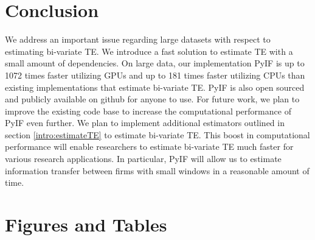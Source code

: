 \section{Conclusion}

We address an important issue regarding large datasets with respect to estimating bi-variate TE. We introduce a fast solution to estimate TE with a small amount of dependencies. On large data, our implementation PyIF is up to 1072 times faster utilizing GPUs and up to 181 times faster utilizing CPUs than existing implementations that estimate bi-variate TE.  PyIF is also open sourced and publicly available on github for anyone to use.  For future work, we plan to improve the existing code base to increase the computational performance of PyIF even further. We plan to implement additional estimators outlined in section  \ref{intro:estimateTE} to estimate bi-variate TE. This boost in computational performance will enable researchers to estimate bi-variate TE much faster for various research applications. In particular, PyIF will allow us to estimate information transfer between firms with small windows in a reasonable amount of time.

\clearpage
\section{Figures and Tables}




